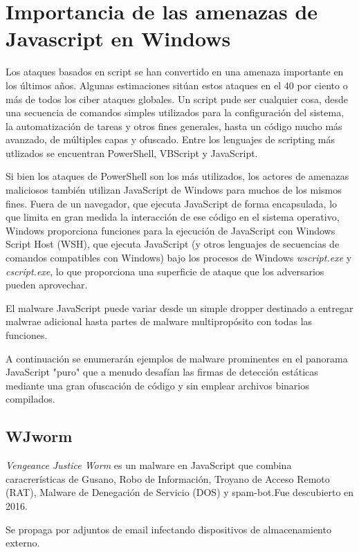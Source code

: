 \documentclass[15pt]{article}
\begin{document}
	\newpage
	\section{Importancia de las amenazas de Javascript en Windows}
	Los ataques basados en script se han convertido en una amenaza importante en los últimos años. Algunas estimaciones sitúan estos ataques en el 40 por ciento o más de todos los ciber ataques globales. Un script pude ser cualquier cosa, desde una secuencia de comandos simples utilizados para la configuración del sistema, la automatización de  tareas y otros fines generales, hasta un código mucho más avanzado, de múltiples capas y ofuscado. Entre los lenguajes de scripting más utlizados se encuentran PowerShell, VBScript y JavaScript.
	
	Si bien los ataques de PowerShell son los más utilizados, los actores de amenazas maliciosos también utilizan JavaScript de Windows para muchos de los mismos fines. Fuera de un navegador, que ejecuta JavaScript de forma encapsulada, lo que limita en gran medida la interacción de ese código en el sistema operativo, Windows proporciona funciones para la ejecución de JavaScript con Windows Script Host (WSH), que ejecuta JavaScript (y otros lenguajes de secuencias de comandos compatibles con Windows) bajo los procesos de Windows \textit{wscript.exe} y \textit{cscript.exe}, lo que proporciona una superficie de ataque que los adversarios pueden aprovechar.
	
	El malware JavaScript puede variar desde un simple dropper destinado a entregar malwrae adicional hasta partes de malware multipropósito con todas las funciones.
	
	A continuación se enumerarán ejemplos de malware prominentes en el panorama JavaScript "puro" que a menudo desafían las firmas de detección estáticas mediante una gran ofuscación de código y sin emplear archivos binarios compilados. \cite{javascript_malware}
	
	\subsection{WJworm}
	\textit{Vengeance Justice Worm} es un malware en JavaScript que combina caracrerísticas de Gusano, Robo de Información, Troyano de Acceso Remoto (RAT), Malware de Denegación de Servicio (DOS) y spam-bot.Fue descubierto en 2016.
	
	Se propaga por adjuntos de email infectando dispositivos de almacenamiento externo.
	
\end{document}
